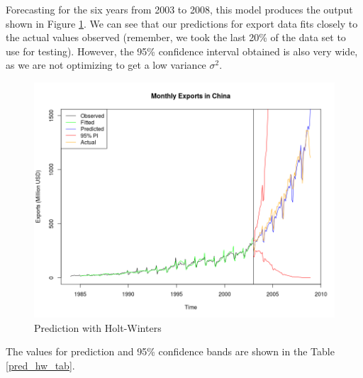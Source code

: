 \documentclass[]{article}
\begin{document}
Forecasting for the six years from 2003 to 2008, this model produces the output shown in Figure \ref{pred_hw}. We can see that our predictions for export data fits closely to the actual values observed (remember, we took the last 20\% of the data set to use for testing). However, the 95\% confidence interval obtained is also very wide, as we are not optimizing to get a low variance $\sigma^2$. 

\begin{figure}[!ht]
\centering
\includegraphics[width=\textwidth]{pred_hw}
\caption{Prediction with Holt-Winters}
\label{pred_hw}
\end{figure}

The values for prediction and 95\% confidence bands are shown in the Table \ref{pred_hw_tab}.

\begin{table}[!ht]
\centering
{}
\caption{2003 forecast and 95\% confidence interval bands for Holt-Winters}
\label{pred_hw_tab}
\end{table}
\end{document}
